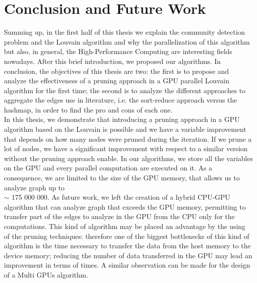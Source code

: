 \section{Conclusion and Future Work}\label{c8}
Summing up, in the first half of this thesis we explain the community detection problem and the Louvain algorithm and why the parallelization of this algorithm but also, in general, the High-Performance Computing are interesting fields nowadays. After this brief introduction, we proposed our algorithms.
In conclusion, the objectives of this thesis are two: the first is to propose and analyze the effectiveness of a pruning approach in a GPU parallel Louvain algorithm for the first time; the second is to analyze the different approaches to aggregate the edges use in literature, i.e. the sort-reduce approach versus the hashmap, in order to find the pro and cons of each one. \\
In this thesis, we demonstrate that introducing a pruning approach in a GPU algorithm based on the Louvain is possible and we have a variable improvement that depends on how many nodes were pruned during the iteration. If we prune a lot of nodes, we have a  significant improvement with respect to a similar version without the pruning approach enable. In our algorithms, we store all the variables on the GPU and every parallel computation are executed on it. As a consequence, we are limited to the size of the GPU memory, that allows us to analyze graph up to \\$\sim$ 175 000 000. As future work, we left the creation of a hybrid CPU-GPU algorithm that can analyze graph that exceeds the GPU memory, permitting to transfer part of the edges to analyze in the GPU from the CPU only for the computations. This kind of algorithm may be placed an advantage by the using of the pruning techniques: therefore one of the biggest bottlenecks of this kind of algorithm is the time necessary to transfer the data from the host memory to the device memory; reducing the number of data transferred in the GPU may lead an improvement in terms of times. A similar observation can be made for the design of a Multi GPUs algorithm. \\
